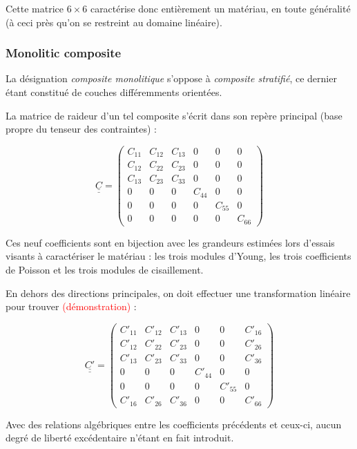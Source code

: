 \documentclass{article}
\begin{document}
Cette matrice $6\times 6$ caractérise donc entièrement un matériau, en toute généralité (à ceci près qu'on se restreint au domaine linéaire).

\subsubsection{Monolitic composite}

La désignation \emph{composite monolitique} s'oppose à \emph{composite stratifié}, ce dernier étant constitué de couches différemments orientées.

La matrice de raideur d'un tel composite s'écrit dans son repère principal (base propre du tenseur des contraintes) :

\[
\underline{\underline{C}}=\left(\begin{matrix}
C_{11} & C_{12} & C_{13} & 0 & 0 & 0 \\
C_{12} & C_{22} & C_{23} & 0 & 0 & 0 \\
C_{13} & C_{23} & C_{33} & 0 & 0 & 0 \\
0 & 0 & 0 & C_{44} & 0 & 0 \\
0 & 0 & 0 & 0 & C_{55} & 0 \\
0 & 0 & 0 & 0 & 0 & C_{66}
\end{matrix}\right)
\]

Ces neuf coefficients sont en bijection avec les grandeurs estimées lors d'essais visants à caractériser le matériau : les trois modules d'Young, les trois coefficients de Poisson et les trois modules de cisaillement.

En dehors des directions principales, on doit effectuer une transformation linéaire pour trouver \textcolor{red}{(démonstration)} :

\[
\underline{\underline{C'}}=\left(\begin{matrix}
C'_{11} & C'_{12} & C'_{13} & 0 & 0 & C'_{16} \\
C'_{12} & C'_{22} & C'_{23} & 0 & 0 & C'_{26} \\
C'_{13} & C'_{23} & C'_{33} & 0 & 0 & C'_{36} \\
0 & 0 & 0 & C'_{44} & 0 & 0 \\
0 & 0 & 0 & 0 & C'_{55} & 0 \\
C'_{16} & C'_{26} & C'_{36} & 0 & 0 & C'_{66}
\end{matrix}\right)
\]

Avec des relations algébriques entre les coefficients précédents et ceux-ci, aucun degré de liberté excédentaire n'étant en fait introduit. 
\end{document}
